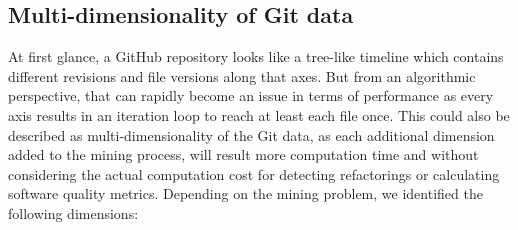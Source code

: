 \documentclass[conference]{IEEEtran}
\begin{document}
\subsection{Multi-dimensionality of Git data}
At first glance, a GitHub repository looks like a tree-like timeline which contains different revisions and file versions along that axes. But from an algorithmic perspective, that can rapidly become an issue in terms of performance as every axis results in an iteration loop to reach at least each file once. This could also be described as multi-dimensionality of the Git data, as each additional dimension added to the mining process, will result more computation time and without considering the actual computation cost for detecting refactorings or calculating software quality metrics. Depending on the mining problem, we identified the following dimensions:\\
\end{document}
